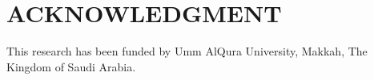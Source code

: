 \documentclass[letterpaper, 10 pt, conference]{ieeeconf}  %
\begin{document}








\section*{ACKNOWLEDGMENT}

This research has been funded by Umm AlQura University, Makkah, The Kingdom of Saudi Arabia.





\end{document}
